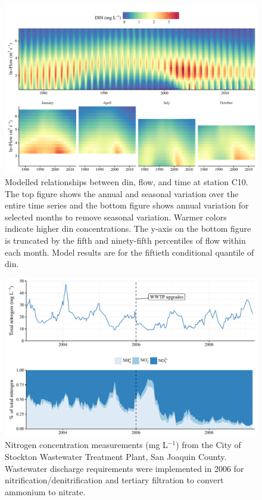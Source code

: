 \documentclass[letterpaper,12pt,oneside]{article}\usepackage[]{graphicx}\usepackage[]{color}
\begin{document}
\begin{figure}[!ht]

{\centering \includegraphics[width=\textwidth]{figs/dinc10dyna-1} 

}

\caption{Modelled relationships between \ac{din}, flow, and time at station C10.  The top figure shows the annual and seasonal variation over the entire time series and the bottom figure shows annual variation for selected months to remove seasonal variation.  Warmer colors indicate higher \ac{din} concentrations.  The y-axis on the bottom figure is truncated by the fifth and ninety-fifth percentiles of flow within each month.  Model results are for the fiftieth conditional quantile of \ac{din}.}\label{fig:dinc10dyna}
\end{figure}



\begin{figure}[!ht]

{\centering \includegraphics[width=\textwidth]{figs/stock-1} 

}

\caption[Nitrogen concentration measurements (mg L$^{-1}$) from the City of Stockton Wastewater Treatment Plant, San Joaquin County]{Nitrogen concentration measurements (mg L$^{-1}$) from the City of Stockton Wastewater Treatment Plant, San Joaquin County.  Wastewater discharge requirements were implemented in 2006 for nitrification/denitrification and tertiary filtration to convert ammonium to nitrate.}\label{fig:stock}
\end{figure}
\end{document}
